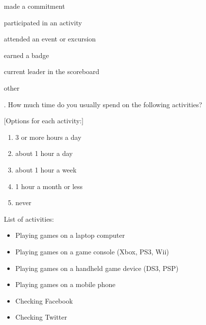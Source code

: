 \begin{checkbox}
	\item made a commitment
	\item participated in an activity
	\item attended an event or excursion
	\item earned a badge
	\item current leader in the scoreboard
	\item other
\end{checkbox}

\vspace{5 mm}
. How much time do you usually spend on the following activities?

[Options for each activity:]

\begin{enumerate}
	\item 3 or more hours a day
	\item about 1 hour a day
	\item about 1 hour a week
	\item 1 hour a month or less
	\item never
\end{enumerate}

\noindent
List of activities:

\begin{itemize}
	\item Playing games on a laptop computer
	\item Playing games on a game console (Xbox, PS3, Wii)
	\item Playing games on a handheld game device (DS3, PSP)
	\item Playing games on a mobile phone
	\item Checking Facebook
	\item Checking Twitter
\end{itemize}


